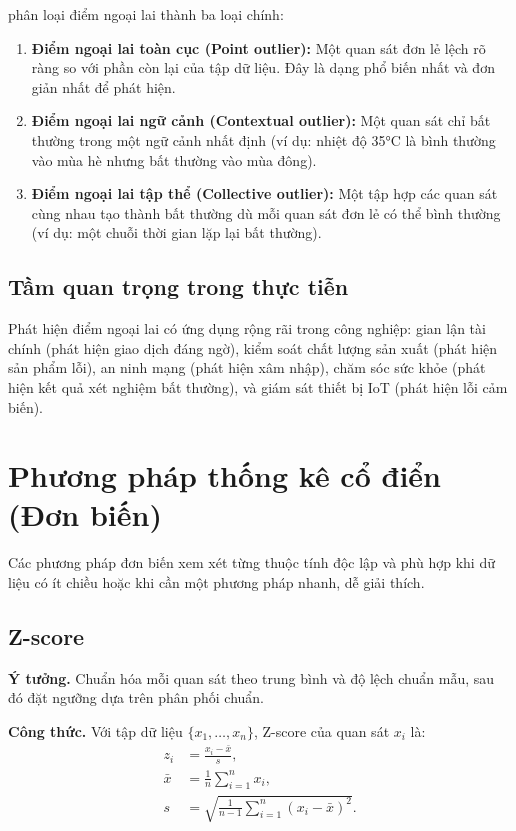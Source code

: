 \documentclass[11pt,a4paper]{article}
\begin{document}
\textcite{chandola2009} phân loại điểm ngoại lai thành ba loại chính:

\begin{enumerate}[noitemsep]
  \item \textbf{Điểm ngoại lai toàn cục (Point outlier):} Một quan sát đơn lẻ lệch rõ ràng so với phần còn lại của tập dữ liệu. Đây là dạng phổ biến nhất và đơn giản nhất để phát hiện.
  \item \textbf{Điểm ngoại lai ngữ cảnh (Contextual outlier):} Một quan sát chỉ bất thường trong một ngữ cảnh nhất định (ví dụ: nhiệt độ 35°C là bình thường vào mùa hè nhưng bất thường vào mùa đông).
  \item \textbf{Điểm ngoại lai tập thể (Collective outlier):} Một tập hợp các quan sát cùng nhau tạo thành bất thường dù mỗi quan sát đơn lẻ có thể bình thường (ví dụ: một chuỗi thời gian lặp lại bất thường).
\end{enumerate}

\subsection{Tầm quan trọng trong thực tiễn}

Phát hiện điểm ngoại lai có ứng dụng rộng rãi trong công nghiệp:
gian lận tài chính (phát hiện giao dịch đáng ngờ), kiểm soát chất lượng sản xuất (phát hiện sản phẩm lỗi),
an ninh mạng (phát hiện xâm nhập), chăm sóc sức khỏe (phát hiện kết quả xét nghiệm bất thường),
và giám sát thiết bị IoT (phát hiện lỗi cảm biến).

\section{Phương pháp thống kê cổ điển (Đơn biến)}

Các phương pháp đơn biến xem xét từng thuộc tính độc lập và phù hợp khi dữ liệu có ít chiều hoặc khi cần một phương pháp nhanh, dễ giải thích.

\subsection{Z-score}

\textbf{Ý tưởng.} Chuẩn hóa mỗi quan sát theo trung bình và độ lệch chuẩn mẫu, sau đó đặt ngưỡng dựa trên phân phối chuẩn.

\textbf{Công thức.} Với tập dữ liệu $\{x_1, \ldots, x_n\}$, Z-score của quan sát $x_i$ là:
\begin{align}
  z_i &= \frac{x_i - \bar{x}}{s}, \\
  \bar{x} &= \frac{1}{n}\sum_{i=1}^n x_i, \\
  s &= \sqrt{\frac{1}{n-1}\sum_{i=1}^n (x_i - \bar{x})^2}.
\end{align}
\end{document}
